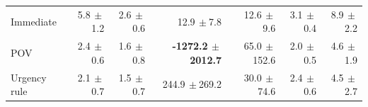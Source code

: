 \begin{table}[!htbp]
\begin{tabular}{lrrrrrr}
Immediate & 5.8{\tiny$\,\pm$1.2} & 2.6{\tiny$\,\pm$0.6} & 12.9{\tiny$\,\pm$7.8} & 12.6{\tiny$\,\pm$9.6} & 3.1{\tiny$\,\pm$0.4} & 8.9{\tiny$\,\pm$2.2} \\
POV & 2.4{\tiny$\,\pm$0.6} & 1.6{\tiny$\,\pm$0.8} & \textbf{-1272.2{\tiny$\,\pm$2012.7}} & 65.0{\tiny$\,\pm$152.6} & 2.0{\tiny$\,\pm$0.5} & 4.6{\tiny$\,\pm$1.9} \\
Urgency rule & 2.1{\tiny$\,\pm$0.7} & 1.5{\tiny$\,\pm$0.7} & 244.9{\tiny$\,\pm$269.2} & 30.0{\tiny$\,\pm$74.6} & 2.4{\tiny$\,\pm$0.6} & 4.5{\tiny$\,\pm$2.7} \\
\bottomrule
\end{tabular}
\end{table}
